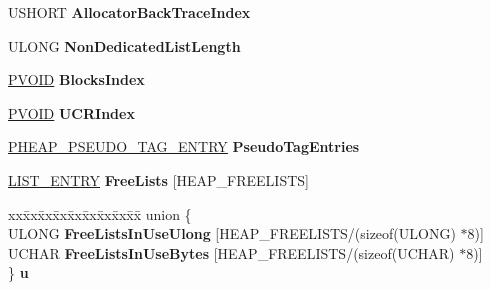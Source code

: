 \begin{DoxyCompactItemize}
U\+S\+H\+O\+RT {\bfseries Allocator\+Back\+Trace\+Index}
\item 
\mbox{\label{struct___h_e_a_p_ac52c3ec0ac95dc17bbe0d0a806ca7ae3}} 
U\+L\+O\+NG {\bfseries Non\+Dedicated\+List\+Length}
\item 
\mbox{\label{struct___h_e_a_p_acbd828f2f1aaec595f13363bb4d55f3f}} 
\hyperlink{interfacevoid}{P\+V\+O\+ID} {\bfseries Blocks\+Index}
\item 
\mbox{\label{struct___h_e_a_p_a6f11f675c5188b0dde91b9f427664b25}} 
\hyperlink{interfacevoid}{P\+V\+O\+ID} {\bfseries U\+C\+R\+Index}
\item 
\mbox{\label{struct___h_e_a_p_aac8ef5f78e539eb46c9fb0a4e2795490}} 
\hyperlink{struct___h_e_a_p___p_s_e_u_d_o___t_a_g___e_n_t_r_y}{P\+H\+E\+A\+P\+\_\+\+P\+S\+E\+U\+D\+O\+\_\+\+T\+A\+G\+\_\+\+E\+N\+T\+RY} {\bfseries Pseudo\+Tag\+Entries}
\item 
\mbox{\label{struct___h_e_a_p_a81257657417a83ae78e0360b03c0a9b4}} 
\hyperlink{struct___l_i_s_t___e_n_t_r_y}{L\+I\+S\+T\+\_\+\+E\+N\+T\+RY} {\bfseries Free\+Lists} \mbox{[}H\+E\+A\+P\+\_\+\+F\+R\+E\+E\+L\+I\+S\+TS\mbox{]}
\item 
\mbox{\label{struct___h_e_a_p_a77ee3c2126ba7e0d69f980ff9a57cfbf}} 
\begin{tabbing}
xx\=xx\=xx\=xx\=xx\=xx\=xx\=xx\=xx\=\kill
union \{\\
\>ULONG {\bfseries FreeListsInUseUlong} \mbox{[}HEAP\_FREELISTS/(sizeof(ULONG) $\ast$8)\mbox{]}\\
\>UCHAR {\bfseries FreeListsInUseBytes} \mbox{[}HEAP\_FREELISTS/(sizeof(UCHAR) $\ast$8)\mbox{]}\\
\} {\bfseries u}\\


\end{tabbing}
\end{DoxyCompactItemize}
